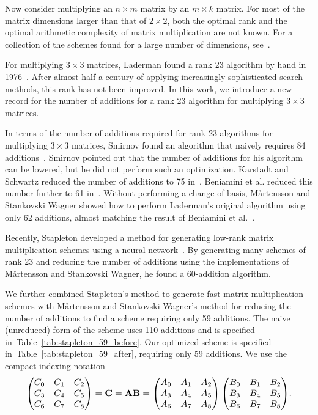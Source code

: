 \documentclass{article}
\newcommand{\tabref}[1]{Table~\ref{tab:#1}}
\begin{document}
Now consider multiplying an $n \times m$ matrix by an $m \times k$ matrix. For most of the matrix dimensions larger than that of $2 \times 2$, both the optimal rank and the optimal arithmetic complexity of matrix multiplication are not known. For a collection of the schemes found for a large number of dimensions, see~\cite{sedoglavicBible}.

For multiplying $3 \times 3$ matrices, Laderman found a rank 23 algorithm by hand in 1976~\cite{Laderman}. After almost half a century of applying increasingly sophisticated search methods, this rank has not been improved. In this work, we introduce a new record for the number of additions for a rank 23 algorithm for multiplying $3 \times 3$ matrices.

In terms of the number of additions required for rank 23 algorithms for multiplying $3 \times 3$ matrices, Smirnov found an algorithm that naively requires 84 additions~\cite{Smirnov}. Smirnov pointed out that the number of additions for his algorithm can be lowered, but he did not perform such an optimization. Karstadt and Schwartz reduced the number of additions to 75 in~\cite{KarstadtSchwartz}. Beniamini et al. reduced this number further to 61 in~\cite{beniamini61Additions}. Without performing a change of basis, Mårtensson and Stankovski Wagner showed how to perform Laderman's original algorithm using only 62 additions, almost matching the result of Beniamini et al.~\cite{MartenssonStankovski}.

Recently, Stapleton developed a method for generating low-rank matrix multiplication schemes using a neural network~\cite{Stapleton}. By generating many schemes of rank 23 and reducing the number of additions using the implementations of Mårtensson and Stankovski Wagner, he found a 60-addition algorithm.

We further combined Stapleton's method to generate fast matrix multiplication schemes with Mårtensson and Stankovski Wagner's method for reducing the number of additions to find a scheme requiring only 59 additions. The naive (unreduced) form of the scheme uses 110 additions and is specified in~\tabref{stapleton_59_before}. Our optimized scheme is specified in~\tabref{stapleton_59_after}, requiring only 59 additions. We use the compact indexing notation
\[
\resizebox{.9\hsize}{!}{$\begin{pmatrix}
        C_{0} & C_{1}  & C_{2}\\
        C_{3} & C_{4}  & C_{5}\\
        C_{6} & C_{7}  & C_{8}
    \end{pmatrix} = \mathbf{C} = \mathbf{A}\mathbf{B} = \begin{pmatrix}
        A_{0} & A_{1}  & A_{2}\\
        A_{3} & A_{4}  & A_{5}\\
        A_{6} & A_{7}  & A_{8}
    \end{pmatrix}
    \begin{pmatrix}
        B_{0} & B_{1} & B_{2}\\
        B_{3} & B_{4} & B_{5}\\
        B_{6} & B_{7} & B_{8}
    \end{pmatrix}$.}
\]
\end{document}
